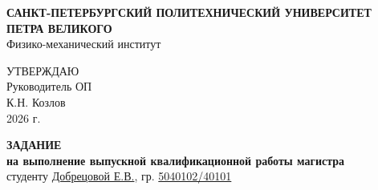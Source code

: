 \newpage
\pagestyle{empty}

\begin{center}
	\textbf{САНКТ-ПЕТЕРБУРГСКИЙ ПОЛИТЕХНИЧЕСКИЙ УНИВЕРСИТЕТ ПЕТРА ВЕЛИКОГО} \\
	\vspace{0.5em}
	Физико-механический институт \\
	\vspace{2em}
\end{center}

\begin{flushright}
	\begin{minipage}{0.35\textwidth} 
		\begin{flushleft} 
			УТВЕРЖДАЮ\\
			Руководитель ОП \\
			К.Н. Козлов \\
			\guillemetleft \underline{\hspace{0.5cm}} \guillemetright \underline{\hspace{3.25cm}} 2026 г. 
		\end{flushleft}
	\end{minipage}
\end{flushright}

\begin{center}
	\textbf{ЗАДАНИЕ} \\
	\textbf{на выполнение выпускной квалификационной работы магистра} \\
	студенту \uline{Добрецовой Е.В.}, гр. \uline{5040102/40101} \\
\end{center}

\vspace{1em}

\vspace{1em}

\noindent

